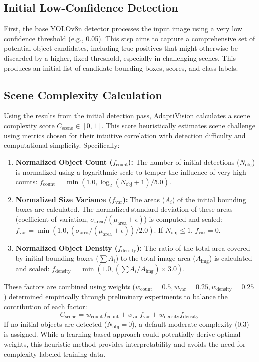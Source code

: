 \documentclass{article}
\begin{document}
\subsection{Initial Low-Confidence Detection}
First, the base YOLOv8n detector processes the input image using a very low confidence threshold (e.g., 0.05). This step aims to capture a comprehensive set of potential object candidates, including true positives that might otherwise be discarded by a higher, fixed threshold, especially in challenging scenes. This produces an initial list of candidate bounding boxes, scores, and class labels.

\subsection{Scene Complexity Calculation}
Using the results from the initial detection pass, AdaptiVision calculates a scene complexity score \( C_{\text{scene}} \in [0, 1] \). This score heuristically estimates scene challenge using metrics chosen for their intuitive correlation with detection difficulty and computational simplicity. Specifically:
\begin{enumerate}
    \item \textbf{Normalized Object Count (\( f_{\text{count}} \)):} The number of initial detections (\( N_{\text{obj}} \)) is normalized using a logarithmic scale to temper the influence of very high counts: \( f_{\text{count}} = \min(1.0, \log_2(N_{\text{obj}} + 1) / 5.0) \).
    \item \textbf{Normalized Size Variance (\( f_{\text{var}} \)):} The areas (\( A_i \)) of the initial bounding boxes are calculated. The normalized standard deviation of these areas (coefficient of variation, \( \sigma_{\text{area}} / (\mu_{\text{area}} + \epsilon) \)) is computed and scaled: \( f_{\text{var}} = \min(1.0, (\sigma_{\text{area}} / (\mu_{\text{area}} + \epsilon)) / 2.0) \). If \( N_{\text{obj}} \le 1 \), \( f_{\text{var}} = 0 \).
    \item \textbf{Normalized Object Density (\( f_{\text{density}} \)):} The ratio of the total area covered by initial bounding boxes (\( \sum A_i \)) to the total image area (\( A_{\text{img}} \)) is calculated and scaled: \( f_{\text{density}} = \min(1.0, (\sum A_i / A_{\text{img}}) \times 3.0) \).
\end{enumerate}
These factors are combined using weights (\( w_{\text{count}}=0.5, w_{\text{var}}=0.25, w_{\text{density}}=0.25 \)) determined empirically through preliminary experiments to balance the contribution of each factor:
\[ C_{\text{scene}} = w_{\text{count}} f_{\text{count}} + w_{\text{var}} f_{\text{var}} + w_{\text{density}} f_{\text{density}} \]
If no initial objects are detected (\(N_{\text{obj}} = 0\)), a default moderate complexity (0.3) is assigned. While a learning-based approach could potentially derive optimal weights, this heuristic method provides interpretability and avoids the need for complexity-labeled training data.
\end{document}
